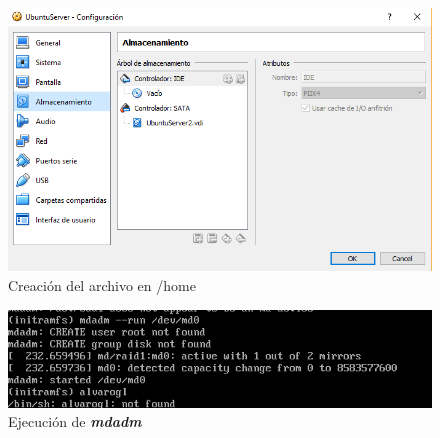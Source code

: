 \begin{figure}[H] %
\centering
\includegraphics[scale=0.8]{cuestionopc1-desenchufamosdisco1.PNG}  %
\caption{Creación del archivo en /home} \label{fig:figura1}
\end{figure}

\begin{figure}[H] %
\centering
\includegraphics[scale=0.8]{cuestionopc1-mdadmconnombre.PNG}  %
\caption{Ejecución de \textbf{\textit{mdadm}}} \label{fig:figura1}
\end{figure}

